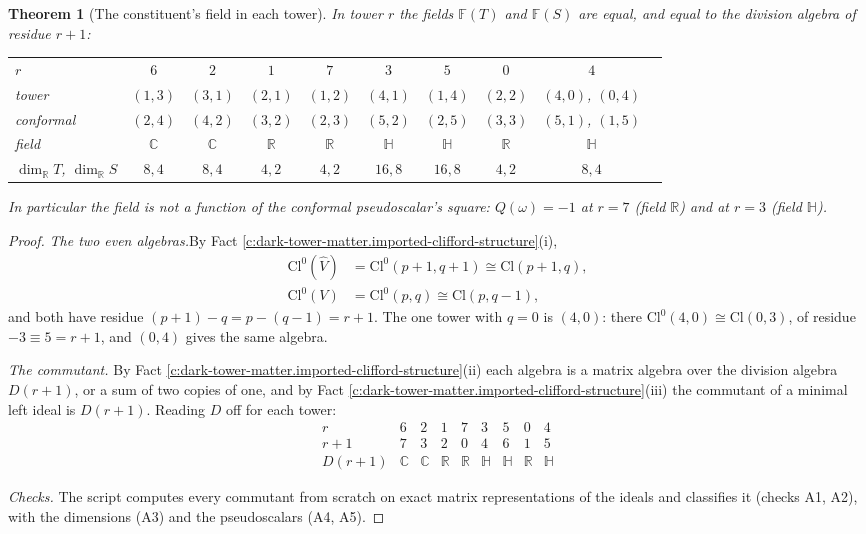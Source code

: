 \documentclass[11pt]{article}
\newtheorem{theorem}{Theorem}[section]
\theoremstyle{definition}
\theoremstyle{plain}
\newcommand{\changedmark}[2]{\marginpar{\raggedright\scriptsize\color{#1}#2}}
\providecommand{\C}{}\renewcommand{\C}{\mathbb{C}}
\providecommand{\Cl}{}\renewcommand{\Cl}{\mathrm{Cl}}
\providecommand{\F}{}\renewcommand{\F}{\mathbb{F}}
\providecommand{\HH}{}\renewcommand{\HH}{\mathbb{H}}
\providecommand{\R}{}\renewcommand{\R}{\mathbb{R}}
\providecommand{\hatV}{}\renewcommand{\hatV}{\widehat{V}}
\begin{document}
\begin{theorem}[The constituent's field in each tower]\label{c:dark-tower-matter.constituents-field}
\changedmark{BurntOrange}{changed since the deposit}
In tower $r$ the fields $\F(T)$ and $\F(S)$ are equal, and equal to the division algebra of residue $r + 1$:
\begin{center}\small
\begin{tabular}{@{}lccccccccc@{}}
\toprule
$r$ & $6$ & $2$ & $1$ & $7$ & $3$ & $5$ & $0$ & $4$ \\
tower & $(1,3)$ & $(3,1)$ & $(2,1)$ & $(1,2)$ & $(4,1)$ & $(1,4)$ & $(2,2)$ & $(4,0)$, $(0,4)$ \\
conformal & $(2,4)$ & $(4,2)$ & $(3,2)$ & $(2,3)$ & $(5,2)$ & $(2,5)$ & $(3,3)$ & $(5,1)$, $(1,5)$ \\
field & $\C$ & $\C$ & $\R$ & $\R$ & $\HH$ & $\HH$ & $\R$ & $\HH$ \\
$\dim_{\R} T$, $\dim_{\R} S$ & $8, 4$ & $8, 4$ & $4, 2$ & $4, 2$ & $16, 8$ & $16, 8$ & $4, 2$ & $8, 4$ \\
\bottomrule
\end{tabular}
\end{center}
In particular the field is not a function of the conformal pseudoscalar's square: $Q(\omega) = -1$ at $r = 7$ (field $\R$) and at $r = 3$ (field $\HH$).
\end{theorem}
\begin{proof}
\textit{The two even algebras.}\enspace By Fact \ref{c:dark-tower-matter.imported-clifford-structure}(i),
\begin{align*}
\Cl^{0}(\hatV) &= \Cl^{0}(p+1, q+1) \cong \Cl(p+1, q), \\
\Cl^{0}(V) &= \Cl^{0}(p, q) \cong \Cl(p, q-1),
\end{align*}
and both have residue $(p+1) - q = p - (q-1) = r + 1$. The one tower with $q = 0$ is $(4,0)$: there $\Cl^{0}(4,0) \cong \Cl(0,3)$, of residue $-3 \equiv 5 = r + 1$, and $(0,4)$ gives the same algebra.



\emph{The commutant.}  By Fact \ref{c:dark-tower-matter.imported-clifford-structure}(ii) each algebra is a matrix algebra over the division algebra $D(r+1)$, or a sum of two copies of one, and by Fact \ref{c:dark-tower-matter.imported-clifford-structure}(iii) the commutant of a minimal left ideal is $D(r+1)$. Reading $D$ off for each tower:
\[
\begin{array}{c|cccccccc}
r & 6 & 2 & 1 & 7 & 3 & 5 & 0 & 4 \\
r + 1 & 7 & 3 & 2 & 0 & 4 & 6 & 1 & 5 \\ \hline
D(r+1) & \C & \C & \R & \R & \HH & \HH & \R & \HH
\end{array}
\]



\emph{Checks.}  The script computes every commutant from scratch on exact matrix representations of the ideals and classifies it (checks A1, A2), with the dimensions (A3) and the pseudoscalars (A4, A5).

\end{proof}
\end{document}
